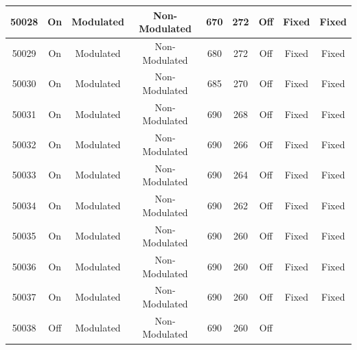 \documentclass[preprint,12pt,authoryear]{elsarticle}
\begin{document}
\begin{center}
\begin{table}[!ht]
\begin{tabular}{|| c || c | c | c | c | c | c | c | c ||}
        \hline
        50028 & On\cellcolor{MyYellow}& Modulated\cellcolor{Mygreen} & Non-Modulated\cellcolor{Myred} & 670 & 272 & Off\cellcolor{Myred} & Fixed\cellcolor{Myred} & Fixed\cellcolor{Myred}\\
        \hline
        50029 & On\cellcolor{MyYellow}& Modulated\cellcolor{Mygreen} & Non-Modulated\cellcolor{Myred} & 680 & 272 & Off\cellcolor{Myred} & Fixed\cellcolor{Myred} & Fixed\cellcolor{Myred}\\
        \hline
        50030 & On\cellcolor{MyYellow}& Modulated\cellcolor{Mygreen} & Non-Modulated\cellcolor{Myred} & 685 & 270 & Off\cellcolor{Myred} & Fixed\cellcolor{Myred} & Fixed\cellcolor{Myred}\\
        \hline
        50031 & On\cellcolor{MyYellow}& Modulated\cellcolor{Mygreen} & Non-Modulated\cellcolor{Myred} & 690 & 268 & Off\cellcolor{Myred} & Fixed\cellcolor{Myred} & Fixed\cellcolor{Myred}\\
        \hline
        50032 & On\cellcolor{MyYellow}& Modulated\cellcolor{Mygreen} & Non-Modulated\cellcolor{Myred} & 690 & 266 & Off\cellcolor{Myred} & Fixed\cellcolor{Myred} & Fixed\cellcolor{Myred}\\
        \hline
        50033 & On\cellcolor{MyYellow}& Modulated\cellcolor{Mygreen} & Non-Modulated\cellcolor{Myred} & 690 & 264 & Off\cellcolor{Myred} & Fixed\cellcolor{Myred} & Fixed\cellcolor{Myred}\\
        \hline
        50034 & On\cellcolor{MyYellow}& Modulated\cellcolor{Mygreen} & Non-Modulated\cellcolor{Myred} & 690 & 262 & Off\cellcolor{Myred} & Fixed\cellcolor{Myred} & Fixed\cellcolor{Myred}\\
        \hline
        50035 & On\cellcolor{MyYellow}& Modulated\cellcolor{Mygreen} & Non-Modulated\cellcolor{Myred} & 690 & 260 & Off\cellcolor{Myred} & Fixed\cellcolor{Myred} & Fixed\cellcolor{Myred}\\
        \hline
        50036 & On\cellcolor{MyYellow}& Modulated\cellcolor{Mygreen} & Non-Modulated\cellcolor{Myred} & 690 & 260 & Off\cellcolor{Myred} & Fixed\cellcolor{Myred} & Fixed\cellcolor{Myred}\\
        \hline
        50037 & On\cellcolor{MyYellow}& Modulated\cellcolor{Mygreen} & Non-Modulated\cellcolor{Myred} & 690 & 260 & Off\cellcolor{Myred} & Fixed\cellcolor{Myred} & Fixed\cellcolor{Myred}\\
        \hline
        50038 & Off\cellcolor{MyBlue} & Modulated\cellcolor{Mygreen} & Non-Modulated\cellcolor{Myred} & 690 & 260 & Off\cellcolor{Myred} &  & \\

\end{tabular}
\end{table}
\end{center}
\end{document}
